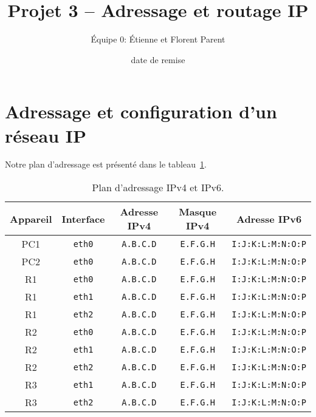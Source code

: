 \documentclass[]{article}
\title{Projet 3 -- Adressage et routage IP}
\author{Équipe 0: Étienne et Florent Parent} %
\date{date de remise} %
\begin{document}
\maketitle

\section*{Adressage et configuration d'un réseau IP}

Notre plan d'adressage est présenté dans le tableau~\ref{tab:plan-adressage}.


\begin{center}
      \begin{table}
            \begin{tabular}{ c c c c c }
                  \toprule
                  \textbf{Appareil} & \textbf{Interface} & \textbf{Adresse IPv4} & \textbf{Masque IPv4} & \textbf{Adresse IPv6}\\
                  \toprule
                  PC1 & \texttt{eth0} & \texttt{A.B.C.D} & \texttt{E.F.G.H} & \texttt{I:J:K:L:M:N:O:P}\\
                  \midrule
                  PC2 & \texttt{eth0} & \texttt{A.B.C.D} & \texttt{E.F.G.H} & \texttt{I:J:K:L:M:N:O:P}\\
                  \midrule
                  R1 & \texttt{eth0} & \texttt{A.B.C.D} & \texttt{E.F.G.H} & \texttt{I:J:K:L:M:N:O:P}\\
                  R1 & \texttt{eth1} & \texttt{A.B.C.D} & \texttt{E.F.G.H} & \texttt{I:J:K:L:M:N:O:P}\\
                  R1 & \texttt{eth2} & \texttt{A.B.C.D} & \texttt{E.F.G.H} & \texttt{I:J:K:L:M:N:O:P}\\
                  \midrule
                  R2 & \texttt{eth0} & \texttt{A.B.C.D} & \texttt{E.F.G.H} & \texttt{I:J:K:L:M:N:O:P}\\
                  R2 & \texttt{eth1} & \texttt{A.B.C.D} & \texttt{E.F.G.H} & \texttt{I:J:K:L:M:N:O:P}\\
                  R2 & \texttt{eth2} & \texttt{A.B.C.D} & \texttt{E.F.G.H} & \texttt{I:J:K:L:M:N:O:P}\\
                  \midrule
                  R3 & \texttt{eth1} & \texttt{A.B.C.D} & \texttt{E.F.G.H} & \texttt{I:J:K:L:M:N:O:P}\\
                  R3 & \texttt{eth2} & \texttt{A.B.C.D} & \texttt{E.F.G.H} & \texttt{I:J:K:L:M:N:O:P}\\
            \end{tabular}
            \caption{Plan d'adressage IPv4 et IPv6.}
            \label{tab:plan-adressage}
      \end{table}
\end{center}
\end{document}
